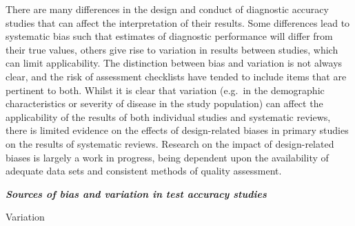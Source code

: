 \documentclass[
  10pt,
  a4paper,
  DIV=11,
  numbers=noendperiod]{scrreprt}
\begin{document}
There are many differences in the design and conduct of diagnostic
accuracy studies that can affect the interpretation of their results.
Some differences lead to systematic bias such that estimates of
diagnostic performance will differ from their true values, others give
rise to variation in results between studies, which can limit
applicability. The distinction between bias and variation is not always
clear, and the risk of assessment checklists have tended to include
items that are pertinent to both. Whilst it is clear that variation
(e.g.~in the demographic characteristics or severity of disease in the
study population) can affect the applicability of the results of both
individual studies and systematic reviews, there is limited evidence on
the effects of design-related biases in primary studies on the results
of systematic reviews. Research on the impact of design-related biases
is largely a work in progress, being dependent upon the availability of
adequate data sets and consistent methods of quality assessment.

\textbf{\emph{Sources of bias and variation in test accuracy studies}}

Variation
\end{document}
